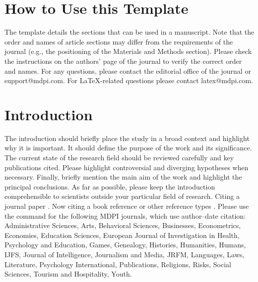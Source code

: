 \documentclass[chicagojournal,article,submit,pdftex,moreauthors]{Definitions/mdpi}
\begin{document}
\setcounter{section}{-1} %
\section{How to Use this Template}

The template details the sections that can be used in a manuscript. Note that the order and names of article sections may differ from the requirements of the journal (e.g., the positioning of the Materials and Methods section). Please check the instructions on the authors' page of the journal to verify the correct order and names. For any questions, please contact the editorial office of the journal or support@mdpi.com. For LaTeX-related questions please contact latex@mdpi.com.%


\section{Introduction}

The introduction should briefly place the study in a broad context and highlight why it is important. It should define the purpose of the work and its significance. The current state of the research field should be reviewed carefully and key publications cited. Please highlight controversial and diverging hypotheses when necessary. Finally, briefly mention the main aim of the work and highlight the principal conclusions. As far as possible, please keep the introduction comprehensible to scientists outside your particular field of research. Citing a journal paper \citep{ref-journal}.  Now citing a book reference \citep{ref-book1,ref-book2} or other reference types \citep{ref-unpublish,ref-url}. Please use the command \citep{ref-proceeding,ref-thesis} for the following MDPI journals, which use author--date citation: Administrative Sciences, Arts, Behavioral Sciences, Businesses, Econometrics, Economies, Education Sciences, European Journal of Investigation in Health, Psychology and Education, Games, Genealogy, Histories, Humanities, Humans, IJFS, Journal of Intelligence, Journalism and Media, JRFM, Languages, Laws, Literature, Psychology International, Publications, Religions, Risks, Social Sciences, Tourism and Hospitality, Youth. 
\end{document}
